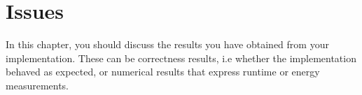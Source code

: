 \chapter{Issues}
In this chapter, you should discuss the results you have obtained from your implementation.
These can be correctness results, i.e whether the implementation behaved as expected, or numerical results that express runtime or energy measurements.